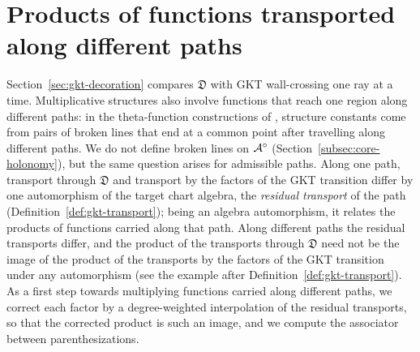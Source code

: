 \section{Products of functions transported along different paths}
\label{app:residual-coherence}

Section~\ref{sec:gkt-decoration} compares $\mathfrak D$ with GKT
wall-crossing one ray at a time.  Multiplicative structures also involve
functions that reach one region along different paths: in the theta-function
constructions of
\cite{grosshackingkeel2015,grossetal2018canonical,grossetal2016theta},
structure constants come from pairs of broken lines that end at a common
point after travelling along different paths.  We do not define broken lines
on $\mathcal A^\circ$ (Section~\ref{subsec:core-holonomy}), but the same question
arises for admissible paths.  Along one path, transport through $\mathfrak D$
and transport by the factors of the GKT transition differ by one automorphism
of the target chart algebra, the \emph{residual transport} of the path
(Definition~\ref{def:gkt-transport}); being an algebra automorphism, it
relates the products of functions carried along that path.  Along different
paths the residual transports differ, and the product of the transports
through $\mathfrak D$ need not be the image of the product of the
transports by the factors of the GKT transition under any automorphism (see the example after
Definition~\ref{def:gkt-transport}).  As
a first step towards multiplying functions carried along different paths, we
correct each factor by a degree-weighted interpolation of the residual
transports, so that the corrected product is such an image, and we compute
the associator between parenthesizations.

